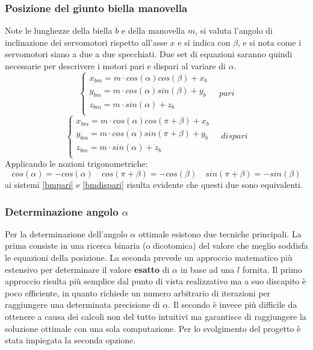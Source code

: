 \documentclass[11pt]{article}
\begin{document}
\subsubsection{Posizione del giunto biella manovella}
Note le lunghezze della biella $b$ e della manovella $m$, si valuta l'angolo di inclinazione dei servomotori rispetto all'asse $x$ e si indica con $\beta$, e si nota come i servomotori siano a due a due specchiati. Due set di equazioni saranno quindi necessarie per descrivere i motori pari e dispari al variare di $\alpha$.
\begin{equation}\label{bmpari}
    \begin{cases}
      x_{bm}=m \cdot cos(\alpha)cos(\beta)+x_b\\
      y_{bm}=m \cdot cos(\alpha)sin(\beta)+y_b\\
      z_{bm}=m \cdot sin(\alpha)+z_b\\
    \end{cases}\quad pari
\end{equation}
\begin{equation}\label{bmdispari}
    \begin{cases}
      x_{bm}=m \cdot cos(\alpha)cos(\pi+\beta)+x_b\\
      y_{bm}=m \cdot cos(\alpha)sin(\pi+\beta)+y_b\\
      z_{bm}=m \cdot sin(\alpha)+z_b\\
    \end{cases}\quad dispari
\end{equation}
Applicando le nozioni trigonometriche: 
$$cos(\alpha)=-cos(\alpha) \quad cos(\pi+\beta)=-cos(\beta) \quad sin(\pi+\beta)=-sin(\beta)$$
ai sistemi \eqref{bmpari} e \eqref{bmdispari} risulta evidente che questi due sono equivalenti.
\subsubsection{Determinazione angolo $\alpha$}
Per la determinazione dell'angolo $\alpha$ ottimale esistono due tecniche principali. La prima consiste in una ricerca binaria (o dicotomica) del valore che meglio soddisfa le equazioni della posizione. La seconda prevede un approccio matematico più estensivo per determinare il valore \textbf{esatto} di $\alpha$ in base ad una $l$ fornita. Il primo approccio risulta più semplice dal punto di vista realizzativo ma a suo discapito è poco efficiente, in quanto richiede un numero arbitrario di iterazioni per raggiungere una determinata precisione di $\alpha$. Il secondo è invece più difficile da ottenere a causa dei calcoli non del tutto intuitivi ma garantisce di raggiungere la soluzione ottimale con una sola computazione. Per lo svolgimento del progetto è stata impiegata la seconda opzione.
\end{document}
